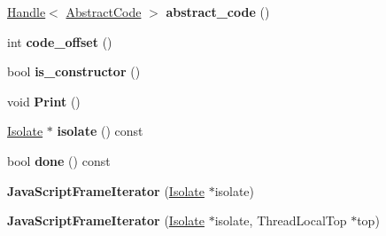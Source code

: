 \begin{DoxyCompactItemize}
\item 
\hyperlink{classv8_1_1internal_1_1_handle}{Handle}$<$ \hyperlink{classv8_1_1internal_1_1_abstract_code}{Abstract\+Code} $>$ {\bfseries abstract\+\_\+code} ()\hypertarget{classv8_1_1internal_1_1_b_a_s_e___e_m_b_e_d_d_e_d_a6be8c7ddfaf6486bef83dfebe6c0eebe}{}\label{classv8_1_1internal_1_1_b_a_s_e___e_m_b_e_d_d_e_d_a6be8c7ddfaf6486bef83dfebe6c0eebe}

\item 
int {\bfseries code\+\_\+offset} ()\hypertarget{classv8_1_1internal_1_1_b_a_s_e___e_m_b_e_d_d_e_d_a59341303ce3b2bb85f611adfb7e1e26b}{}\label{classv8_1_1internal_1_1_b_a_s_e___e_m_b_e_d_d_e_d_a59341303ce3b2bb85f611adfb7e1e26b}

\item 
bool {\bfseries is\+\_\+constructor} ()\hypertarget{classv8_1_1internal_1_1_b_a_s_e___e_m_b_e_d_d_e_d_a1e8e4f12a6d781f24d6b36e42bfbb6e9}{}\label{classv8_1_1internal_1_1_b_a_s_e___e_m_b_e_d_d_e_d_a1e8e4f12a6d781f24d6b36e42bfbb6e9}

\item 
void {\bfseries Print} ()\hypertarget{classv8_1_1internal_1_1_b_a_s_e___e_m_b_e_d_d_e_d_a46a53ffebb3d6a5f5ba0096bb38e70a7}{}\label{classv8_1_1internal_1_1_b_a_s_e___e_m_b_e_d_d_e_d_a46a53ffebb3d6a5f5ba0096bb38e70a7}

\item 
\hyperlink{classv8_1_1internal_1_1_isolate}{Isolate} $\ast$ {\bfseries isolate} () const \hypertarget{classv8_1_1internal_1_1_b_a_s_e___e_m_b_e_d_d_e_d_a8fd23ecb465f23cd3c60deb9a7bde1f8}{}\label{classv8_1_1internal_1_1_b_a_s_e___e_m_b_e_d_d_e_d_a8fd23ecb465f23cd3c60deb9a7bde1f8}

\item 
bool {\bfseries done} () const \hypertarget{classv8_1_1internal_1_1_b_a_s_e___e_m_b_e_d_d_e_d_a77341a218534a8b462a85c130ee86cfc}{}\label{classv8_1_1internal_1_1_b_a_s_e___e_m_b_e_d_d_e_d_a77341a218534a8b462a85c130ee86cfc}

\item 
{\bfseries Java\+Script\+Frame\+Iterator} (\hyperlink{classv8_1_1internal_1_1_isolate}{Isolate} $\ast$isolate)\hypertarget{classv8_1_1internal_1_1_b_a_s_e___e_m_b_e_d_d_e_d_a511ffe36c262477bd8fa4cf10f6afff9}{}\label{classv8_1_1internal_1_1_b_a_s_e___e_m_b_e_d_d_e_d_a511ffe36c262477bd8fa4cf10f6afff9}

\item 
{\bfseries Java\+Script\+Frame\+Iterator} (\hyperlink{classv8_1_1internal_1_1_isolate}{Isolate} $\ast$isolate, Thread\+Local\+Top $\ast$top)\hypertarget{classv8_1_1internal_1_1_b_a_s_e___e_m_b_e_d_d_e_d_a31d1e8d546942c7819fca9b1c5adbfdd}{}\label{classv8_1_1internal_1_1_b_a_s_e___e_m_b_e_d_d_e_d_a31d1e8d546942c7819fca9b1c5adbfdd}


\end{DoxyCompactItemize}
